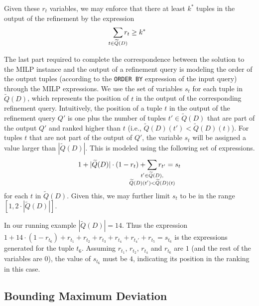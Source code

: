 Given these $r_t$ variables, we may enforce that there at least $k^*$  tuples in the output of the refinement by the expression
\begin{align}
    \sum_{\mathclap{t \in \widetilde{Q}(D)}} r_{t} \geq k^* \label{eq:at_least_k_star_inline}
\end{align}

The last part required to complete the correspondence between the solution to the MILP instance and the output of a refinement query is modeling the order of the output tuples (according to the {\tt ORDER BY} expression of the input query) through the MILP expressions. We use the set of variables $s_t$ for each tuple in $\widetilde{Q}(D)$, which represents the position of $t$ in the output of the corresponding refinement query. Intuitively, the position of a tuple $t$ in the output of the refinement query $Q'$ is one plus the number of tuples $t'\in \widetilde{Q}(D)$ that are part of the output $Q'$ and ranked higher than $t$ (i.e., $\widetilde{Q}(D)(t') < \widetilde{Q}(D)(t)$). For tuples $t$ that are not part of the output of $Q'$, the variable $s_t$ will be assigned a value larger than $|\widetilde{Q}(D)|$. This is modeled using the following set of expressions.
\begin{align}
    1 + |\widetilde{Q}(D)| \cdot (1 - r_t) + \sum_{\mathclap{\substack{t' \in \widetilde{Q}(D),\\ \widetilde{Q}(D)(t') < \widetilde{Q}(D)(t)}}} r_{t'} = s_{t} \label{eq:position_in_ranking_inline}
\end{align}
for each $t$ in $\widetilde{Q}(D)$. Given this, we may further limit $s_t$ to be in the range $[1, 2 \cdot |\widetilde{Q}(D)|]$.

\begin{example}
\label{ex:position}
In our running example $|\widetilde{Q}(D)| = 14$. Thus the expression $1 + 14 \cdot (1 - r_{t_6}) + r_{t_1} + r_{t_2} + r_{t_3} + r_{t_4} + r_{t_4'} + r_{t_5} = s_{t_6}$ is  the expressions generated for the tuple $t_6$. Assuming $r_{t_1}$, $r_{t_2}$, $r_{t_4}$ and $r_{t_6}$ are $1$ (and the rest of the variables are $0$), the value of $s_{t_6}$ must be $4$, indicating its position in the ranking in this case.


\end{example}




\subsection{Bounding Maximum Deviation}

